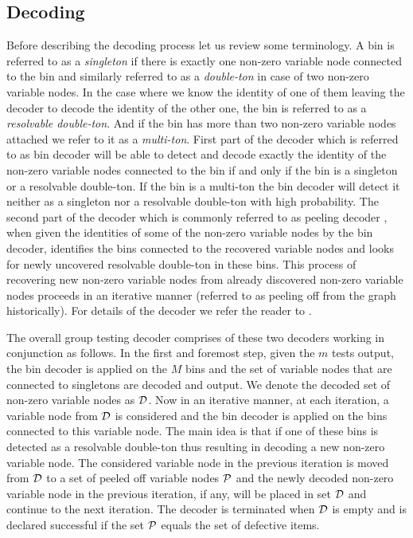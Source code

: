 \subsection*{Decoding}
Before describing the decoding process let us review some terminology. A bin is referred to as a \textit{singleton} if there is exactly one non-zero variable node connected to the bin and similarly referred to as a \textit{double-ton} in case of two non-zero variable nodes. In the case where we know the identity of one of them leaving the decoder to decode the identity of the other one, the bin is referred to as a \textit{resolvable double-ton}. And if the bin has more than two non-zero variable nodes attached we refer to it as a \textit{multi-ton}. First part of the decoder which is referred to as bin decoder will be able to detect and decode exactly the identity of the non-zero variable nodes connected to the bin if and only if the bin is a singleton or a resolvable double-ton. If the bin is a multi-ton the bin decoder will detect it neither as a singleton nor a resolvable double-ton with high probability. The second part of the decoder which is commonly referred to as peeling decoder \cite{li2015subisit}, when given the identities of some of the non-zero variable nodes by the bin decoder, identifies the bins connected to the recovered variable nodes and looks for newly uncovered resolvable double-ton in these bins. This process of recovering new non-zero variable nodes from already discovered non-zero variable nodes proceeds in an iterative manner (referred to as peeling off from the graph historically). For details of the decoder we refer the reader to \cite{lee2015saffron}.

The overall group testing decoder comprises of these two decoders working in conjunction as follows. In the first and foremost step, given the $m$ tests output, the bin decoder is applied on the $M$ bins and the set of variable nodes that are connected to singletons are decoded and output. We denote the decoded set of non-zero variable nodes as $\mathcal{D}$. Now in an iterative manner, at each iteration, a variable node from $\mathcal{D}$ is considered and the bin decoder is applied on the bins connected to this variable node.
The main idea is that if one of these bins is detected as a resolvable double-ton thus resulting in decoding a new non-zero variable node. The considered variable node in the previous iteration is moved from $\mathcal{D}$ to a set of peeled off variable nodes $\mathcal{P}$ and the newly decoded non-zero variable node in the previous iteration, if any, will be placed in set $\mathcal{D}$ and continue to the next iteration. The decoder is terminated when $\mathcal{D}$ is empty and is declared successful if the set $\mathcal{P}$ equals the set of defective items. 

